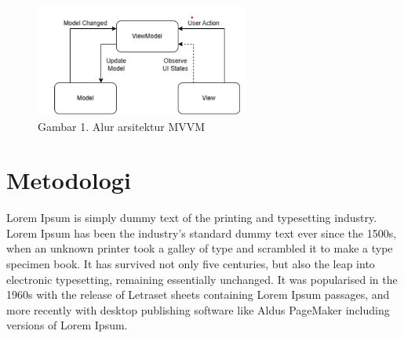 \documentclass[conference]{IEEEtran}
\begin{document}
\begin{figure}[htp]
    \centering
    \includegraphics[width=7cm]{image/MVVM.png}
    \caption{Gambar 1. Alur arsitektur MVVM}
    \label{fig:mvi}
\end{figure}


\section{Metodologi}
Lorem Ipsum is simply dummy text of the printing and typesetting industry. Lorem Ipsum has been the industry's standard dummy text ever since the 1500s, when an unknown printer took a galley of type and scrambled it to make a type specimen book. It has survived not only five centuries, but also the leap into electronic typesetting, remaining essentially unchanged. It was popularised in the 1960s with the release of Letraset sheets containing Lorem Ipsum passages, and more recently with desktop publishing software like Aldus PageMaker including versions of Lorem Ipsum.




\vspace{12pt}
\end{document}
